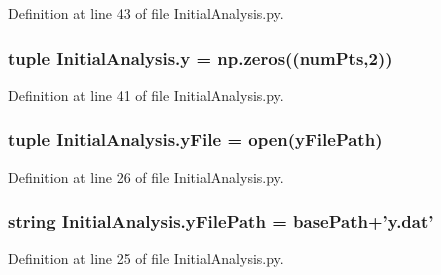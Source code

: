 Definition at line 43 of file Initial\-Analysis.\-py.

\hypertarget{namespace_initial_analysis_aaf8f8cb78972175b1c343dda2cfe01ac}{
\subsubsection[{y}]{\setlength{\rightskip}{0pt plus 5cm}tuple Initial\-Analysis.\-y = np.\-zeros(({\bf num\-Pts},2))}}\label{namespace_initial_analysis_aaf8f8cb78972175b1c343dda2cfe01ac}


Definition at line 41 of file Initial\-Analysis.\-py.

\hypertarget{namespace_initial_analysis_a2ff3e6a83381d10c107126fec5b18bdf}{
\subsubsection[{y\-File}]{\setlength{\rightskip}{0pt plus 5cm}tuple Initial\-Analysis.\-y\-File = open({\bf y\-File\-Path})}}\label{namespace_initial_analysis_a2ff3e6a83381d10c107126fec5b18bdf}


Definition at line 26 of file Initial\-Analysis.\-py.

\hypertarget{namespace_initial_analysis_ad04c497db9193976f5b64077a8e76dbf}{
\subsubsection[{y\-File\-Path}]{\setlength{\rightskip}{0pt plus 5cm}string Initial\-Analysis.\-y\-File\-Path = {\bf base\-Path}+'y.\-dat'}}\label{namespace_initial_analysis_ad04c497db9193976f5b64077a8e76dbf}


Definition at line 25 of file Initial\-Analysis.\-py.

